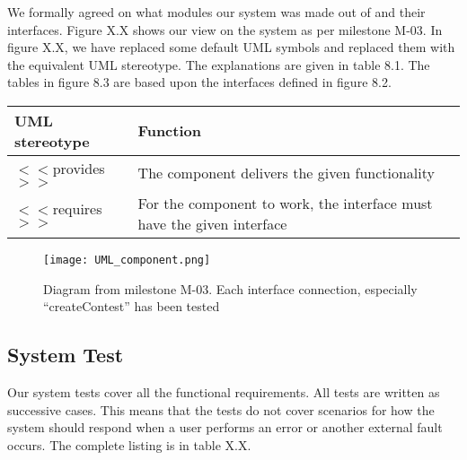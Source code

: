 We formally agreed on what modules our system was made out of and their
interfaces. Figure X.X shows our view on the system as per milestone
M-03. In figure X.X, we have replaced some default UML symbols and
replaced them with the equivalent UML stereotype. The explanations are
given in table 8.1. The tables in figure 8.3 are based upon the
interfaces defined in figure 8.2. 

\begin{longtable}{|l|p{}|}
    \hline
    \textbf{UML stereotype} & \textbf{Function}\\
    \hline

    $<<$provides$>>$ & The component delivers the given functionality \\
    \hline

    $<<$requires$>>$& For the component to work, the interface must have the given interface\\
        \hline
    \end{longtable}

    \begin{figure}[h!]
        \texttt{[image: UML\_component.png]}
        \caption{Diagram from milestone M-03. Each interface connection, especially
        ``createContest'' has been tested}
\end{figure}

\subsection{System Test}
Our system tests cover all the functional requirements. All tests are
written as successive cases. This means that the tests do not cover
scenarios for how the system should respond when a user performs an
error or another external fault occurs. The complete listing is in
table X.X.

